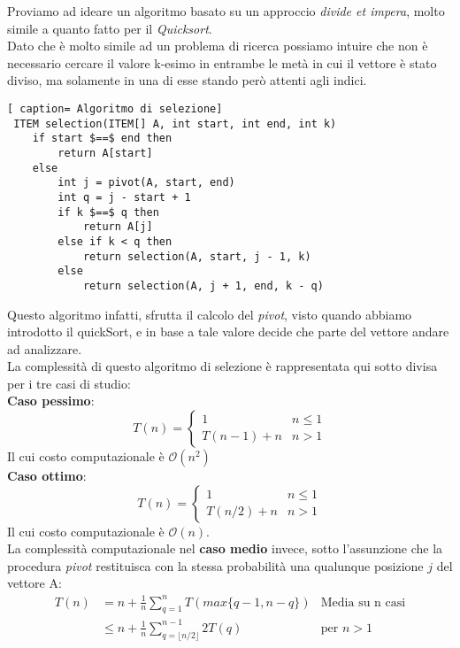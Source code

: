 \documentclass[../cheatSheetAlgoritmi.tex]{subfiles}
\begin{document}
Proviamo ad ideare un algoritmo basato su un approccio \emph{divide et impera}, molto simile a quanto fatto per il \emph{Quicksort}. \\
Dato che è molto simile ad un problema di ricerca possiamo intuire che non è necessario cercare il valore k-esimo in entrambe le metà in cui il vettore è stato diviso, ma solamente in una di esse stando però attenti agli indici.
 \begin{lstlisting}[ caption= Algoritmo di selezione]
 ITEM selection(ITEM[] A, int start, int end, int k) 	
 	if start $==$ end then
 		return A[start]
 	else 
 		int j = pivot(A, start, end)
 		int q = j - start + 1
 		if k $==$ q then
 			return A[j]
 		else if k < q then
 			return selection(A, start, j - 1, k)
 		else
 			return selection(A, j + 1, end, k - q)
\end{lstlisting}
Questo algoritmo infatti, sfrutta il calcolo del \emph{pivot}, visto quando abbiamo introdotto il quickSort, e in base a tale valore decide che parte del vettore andare ad analizzare. \\
La complessità di questo algoritmo di selezione è rappresentata qui sotto divisa per i tre casi di studio: \\
\textbf{Caso pessimo}: 
\begin{equation*}
    T(n)=\begin{cases}
        1 & \text{$n \leq 1$}\\
        T(n - 1) + n & \text{$n > 1$}
    \end{cases}
\end{equation*}
Il cui costo computazionale è $\mathcal{O}(n^2)$ \\
\textbf{Caso ottimo}: 
\begin{equation*}
    T(n)=\begin{cases}
        1 & \text{$n \leq 1$}\\
        T(n/2) + n & \text{$n > 1$}
    \end{cases}
\end{equation*}
Il cui costo computazionale è $\mathcal{O}(n)$. \\
La complessità computazionale nel \textbf{caso medio} invece, sotto l'assunzione che la procedura \emph{pivot} restituisca con la stessa probabilità una qualunque posizione $j$ del vettore A:
\begin{align*}
	 T(n) &= n + \frac{1}{n} \sum_{q = 1}^{n} T(max\{q - 1, n - q\}) &\text{Media su n casi} \\
	& \leq n + \frac{1}{n} \sum_{q = \lfloor n/2 \rfloor}^{n-1} 2T(q)  &\text{per $n > 1$} 
\end{align*}
\end{document}

